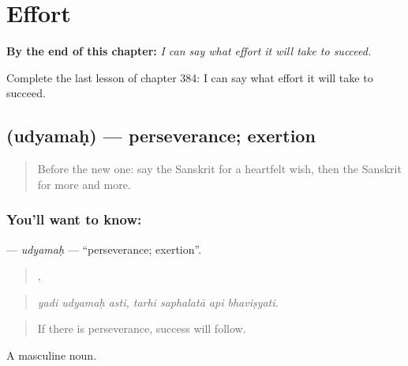 
\chapter{Effort}
\label{ch:sa-effort}

\begin{chapteropening}
\textbf{By the end of this chapter:} \emph{I can say what effort it will take to succeed.}

Complete the last lesson of chapter 384: I can say what effort it will take to succeed.
\end{chapteropening}

\section[\texorpdfstring{\sk{उद्यमः} (udyamaḥ)}{उद्यमः (udyamaḥ)}]{ (udyamaḥ) — perseverance; exertion}

\label{lesson:SA-C384-udyamah}



\begin{quote}
Before the new one: say the Sanskrit for a heartfelt wish, then the Sanskrit for more and more.
\end{quote}

\subsection*{You'll want to know: }
\textbf{} — \emph{udyamaḥ} — \textquotedblleft{}perseverance; exertion\textquotedblright{}.

\begin{quote}
  ,    
\end{quote}

\begin{quote}
\emph{yadi udyamaḥ asti, tarhi saphalatā api bhaviṣyati.}
\end{quote}

\begin{quote}
If there is perseverance, success will follow.
\end{quote}

A masculine noun.

